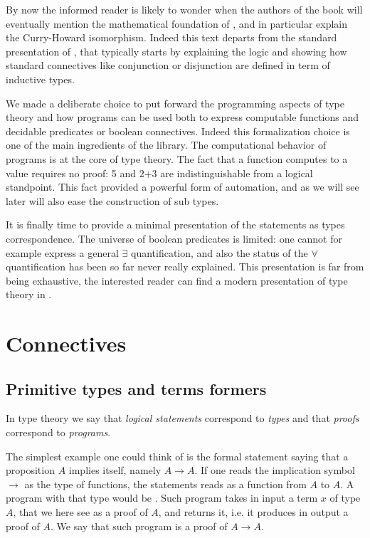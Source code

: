 \label{ch:ttch}

By now the informed reader is likely to wonder when the authors of the book
will eventually mention the mathematical foundation of \Coq{}, 
and
in particular explain the Curry-Howard isomorphism.  Indeed this text departs
from the standard presentation of \Coq{}, that typically starts by
explaining the logic and showing how standard connectives like
conjunction or disjunction are defined in term of inductive types.

We made a deliberate choice to put forward the programming aspects of
type theory and how programs can be used both to express computable functions
and decidable predicates or boolean connectives.
Indeed this formalization choice is one of the main ingredients of the \mcbMC{}
library.  The computational behavior of programs is at the core of
type theory.  The fact that a function computes to a value requires no
proof: 5 and 2+3 are indistinguishable from a logical standpoint.
This fact provided a powerful form of automation, and as we will
see later will also ease the construction of sub types.

It is finally time to provide a minimal presentation of the statements as types
correspondence.  The universe of boolean predicates is limited: one
cannot for example express a general $\exists$ quantification, and also the
status of the $\forall$ quantification has been so far never really explained.
This presentation is far from being exhaustive, the interested reader can find
a modern presentation of type theory in \cite{hottbook}.

\section{Connectives}

\subsection{Primitive types and terms formers}\label{sec:chi}

In type theory we say that \emph{logical statements} correspond to
\emph{types} and that \emph{proofs} correspond to \emph{programs}.

The simplest example one could think of is the formal statement saying that
a proposition $A$ implies itself, namely $A \rightarrow A$.  If one reads
the implication symbol $\to$ as the type of functions, the statements reads
as a function from $A$ to $A$.  A program with that type would be
.  Such program takes in input a term $x$ of
type $A$, that we here see as a proof of $A$, and returns it, i.e. it
produces in output a proof of $A$.  We say that such program is a
proof of $A \rightarrow A$.

